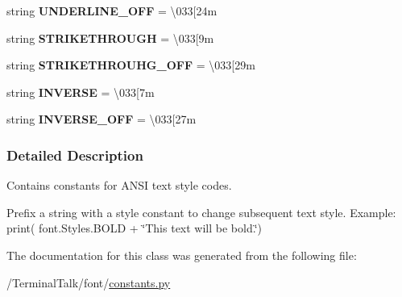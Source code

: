 \begin{DoxyCompactItemize}
\item 
string {\bfseries U\+N\+D\+E\+R\+L\+I\+N\+E\+\_\+\+O\+FF} = \textquotesingle{}\textbackslash{}033\mbox{[}24m\textquotesingle{}\hypertarget{classfont_1_1constants_1_1Styles_a5fabd3fadc86822d9a401c4bec80a966}{}\label{classfont_1_1constants_1_1Styles_a5fabd3fadc86822d9a401c4bec80a966}

\item 
string {\bfseries S\+T\+R\+I\+K\+E\+T\+H\+R\+O\+U\+GH} = \textquotesingle{}\textbackslash{}033\mbox{[}9m\textquotesingle{}\hypertarget{classfont_1_1constants_1_1Styles_a49438d7dd8b4e9de783717b6d4812025}{}\label{classfont_1_1constants_1_1Styles_a49438d7dd8b4e9de783717b6d4812025}

\item 
string {\bfseries S\+T\+R\+I\+K\+E\+T\+H\+R\+O\+U\+H\+G\+\_\+\+O\+FF} = \textquotesingle{}\textbackslash{}033\mbox{[}29m\textquotesingle{}\hypertarget{classfont_1_1constants_1_1Styles_a5406984ee410e185cd36701be2c7c64c}{}\label{classfont_1_1constants_1_1Styles_a5406984ee410e185cd36701be2c7c64c}

\item 
string {\bfseries I\+N\+V\+E\+R\+SE} = \textquotesingle{}\textbackslash{}033\mbox{[}7m\textquotesingle{}\hypertarget{classfont_1_1constants_1_1Styles_a616d45cb55b02a8503229fca77dad35a}{}\label{classfont_1_1constants_1_1Styles_a616d45cb55b02a8503229fca77dad35a}

\item 
string {\bfseries I\+N\+V\+E\+R\+S\+E\+\_\+\+O\+FF} = \textquotesingle{}\textbackslash{}033\mbox{[}27m\textquotesingle{}\hypertarget{classfont_1_1constants_1_1Styles_ab3b2d4eedd8b2a3a437689de4c4262fc}{}\label{classfont_1_1constants_1_1Styles_ab3b2d4eedd8b2a3a437689de4c4262fc}

\end{DoxyCompactItemize}


\subsubsection{Detailed Description}
Contains constants for A\+N\+SI text style codes. 

Prefix a string with a style constant to change subsequent text style. Example\+: print( font.\+Styles.\+B\+O\+LD + \char`\"{}\+This text will be bold.\char`\"{}) 

The documentation for this class was generated from the following file\+:\begin{DoxyCompactItemize}
\item 
/\+Terminal\+Talk/font/\hyperlink{constants_8py}{constants.\+py}\end{DoxyCompactItemize}
